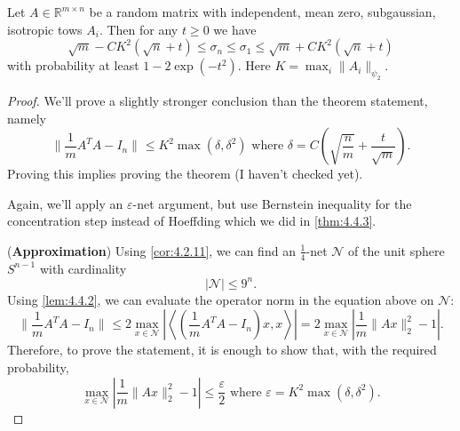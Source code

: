 \begin{theorem}[Name]
\label{thm:4.6.1}
Let $A \in \mathbb{R}^{m \times n}$ be a random matrix with independent, mean zero, subgaussian, isotropic 
tows $A_i$. Then for any $t \geq 0$ we have 
\[ \sqrt{m} - CK^2 (\sqrt{n} + t) \leq \sigma_n \leq \sigma_1 \leq \sqrt{m} + CK^2 (\sqrt{n} + t) \]
with probability at least $1 - 2 \exp{(-t^2)}$. Here $K = \max_{i} \lVert A_i \rVert_{\psi_2}$.
\end{theorem}

\begin{proof}
We'll prove a slightly stronger conclusion than the theorem statement, namely 
\[ \lVert \frac{1}{m}A^TA - I_n \rVert_{} \leq K^2 \max_{}(\delta, \delta^2) \text{ where } 
\delta = C \left( \sqrt{\frac{n}{m}} + \frac{t}{\sqrt{m}} \right). \]
Proving this implies proving the theorem (I haven't checked yet).

Again, we'll apply an $\varepsilon$-net argument, but use Bernstein inequality for the concentration step 
instead of Hoeffding which we did in \cref{thm:4.4.3}.

(\textbf{Approximation}) Using \cref{cor:4.2.11}, we can find an $\frac{1}{4}$-net $\mathcal{N}$ of the unit 
sphere $S^{n - 1}$ with cardinality 
\[ |\mathcal{N}| \leq 9^n. \]
Using \cref{lem:4.4.2}, we can evaluate the operator norm in the equation above on $\mathcal{N}$:
\[ \lVert \frac{1}{m}A^T A - I_n \rVert_{} \leq 2 \max_{x \in \mathcal{N}} 
\left| \left\langle (\frac{1}{m}A^T A - I_n)x, x \right\rangle \right| 
= 2 \max_{x \in \mathcal{N}} \left| \frac{1}{m} \lVert Ax \rVert_{2}^2 - 1 \right|. \]
Therefore, to prove the statement, it is enough to show that, with the required probability, 
\[ \max_{x \in \mathcal{N}} \left| \frac{1}{m} \lVert Ax \rVert_{2}^2 - 1 \right| \leq \frac{\varepsilon}{2} 
\text{ where } \varepsilon = K^2 \max_{}(\delta, \delta^2). \]


\end{proof}

